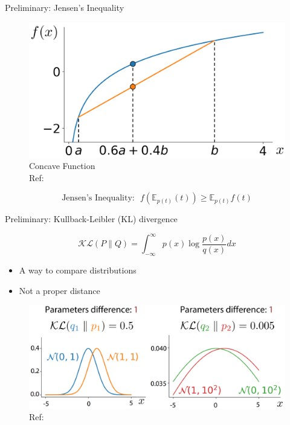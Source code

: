 \documentclass{beamer}
\begin{document}
\begin{frame}{Preliminary: Jensen's Inequality}
\begin{figure}
    \centering
    \includegraphics[width=0.6\columnwidth]{exp/concave.png}
    \caption{Concave Function\\\textcolor{BGpurple}{Ref: \cite{bayesML}}}
\end{figure}
$$\text{Jensen's Inequality:~~}f\left(\mathbb{E}_{p(t)}(t)\right)\geq \mathbb{E}_{p(t)}f(t)$$
\end{frame}
\begin{frame}{Preliminary: Kullback-Leibler (KL) divergence}

$$\mathcal{KL}(P\parallel Q)=\int_{-\infty}^{\infty}p(x)\log\frac{p(x)}{q(x)}dx$$

\begin{itemize}
  \item A way to compare distributions
  \item Not a proper distance
\end{itemize}

\begin{figure}
    \centering
    \includegraphics[width=0.9\columnwidth]{exp/KL.png}
    \caption{\textcolor{BGpurple}{Ref: \cite{bayesML}}}
\end{figure}

\end{frame}
\end{document}
